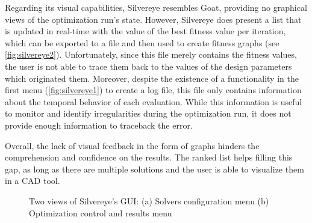 	Regarding its visual capabilities, Silvereye resembles Goat, providing no graphical views of the optimization run's state. However, Silvereye does present a list that is updated in real-time with the value of the best fitness value per iteration, which can be exported to a file and then used to create fitness graphs (see \cref{fig:silvereye2}). Unfortunately, since this file merely contains the fitness values, the user is not able to trace them back to the values of the design parameters which originated them. Moreover, despite the existence of a functionality in the first menu (\cref{fig:silvereye1}) to create a log file, this file only contains information about the temporal behavior of each evaluation. While this information is useful to monitor and identify irregularities during the optimization run, it does not provide enough information to traceback the error. 
	
	Overall, the lack of visual feedback in the form of graphs hinders the comprehension and confidence on the results. The ranked list helps filling this gap, as long as there are multiple solutions and the user is able to visualize them in a \ac{CAD} tool.
	
	\begin{figure}[htbp]
		\centering
		\hfill
		
		\caption[Silvereye GUI]{Two views of Silvereye's \ac{GUI}: (a) Solvers configuration menu (b) Optimization control and results menu}
		\label{fig:silvereye}
	\end{figure}
	
